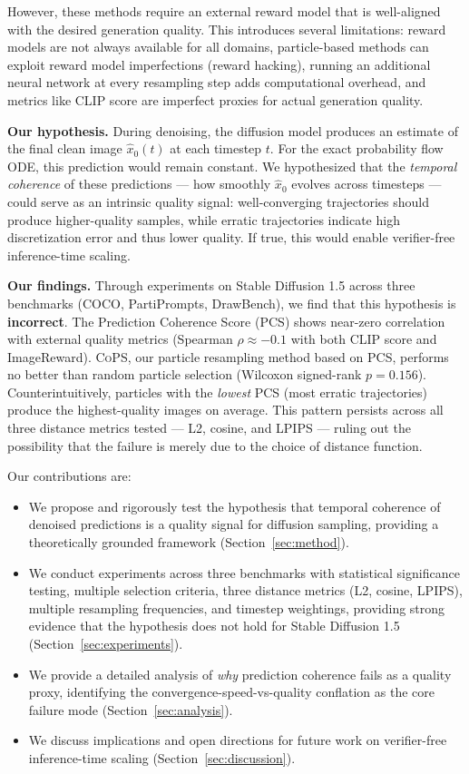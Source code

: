 \documentclass{article}
\newcommand{\cops}{\textsc{CoPS}}
\newcommand{\pcs}{\textsc{PCS}}
\newcommand{\xhat}{\hat{x}_0}
\begin{document}
However, these methods require an external reward model that is well-aligned with the desired generation quality. This introduces several limitations: reward models are not always available for all domains, particle-based methods can exploit reward model imperfections (reward hacking), running an additional neural network at every resampling step adds computational overhead, and metrics like CLIP score are imperfect proxies for actual generation quality.

\textbf{Our hypothesis.} During denoising, the diffusion model produces an estimate of the final clean image $\xhat(t)$ at each timestep $t$. For the exact probability flow ODE, this prediction would remain constant. We hypothesized that the \emph{temporal coherence} of these predictions --- how smoothly $\xhat$ evolves across timesteps --- could serve as an intrinsic quality signal: well-converging trajectories should produce higher-quality samples, while erratic trajectories indicate high discretization error and thus lower quality. If true, this would enable verifier-free inference-time scaling.

\textbf{Our findings.} Through experiments on Stable Diffusion 1.5 across three benchmarks (COCO, PartiPrompts, DrawBench), we find that this hypothesis is \textbf{incorrect}. The Prediction Coherence Score (\pcs{}) shows near-zero correlation with external quality metrics (Spearman $\rho \approx -0.1$ with both CLIP score and ImageReward). \cops{}, our particle resampling method based on \pcs{}, performs no better than random particle selection (Wilcoxon signed-rank $p = 0.156$). Counterintuitively, particles with the \emph{lowest} \pcs{} (most erratic trajectories) produce the highest-quality images on average. This pattern persists across all three distance metrics tested --- L2, cosine, and LPIPS --- ruling out the possibility that the failure is merely due to the choice of distance function.

Our contributions are:
\begin{itemize}
    \item We propose and rigorously test the hypothesis that temporal coherence of denoised predictions is a quality signal for diffusion sampling, providing a theoretically grounded framework (Section~\ref{sec:method}).
    \item We conduct experiments across three benchmarks with statistical significance testing, multiple selection criteria, three distance metrics (L2, cosine, LPIPS), multiple resampling frequencies, and timestep weightings, providing strong evidence that the hypothesis does not hold for Stable Diffusion 1.5 (Section~\ref{sec:experiments}).
    \item We provide a detailed analysis of \emph{why} prediction coherence fails as a quality proxy, identifying the convergence-speed-vs-quality conflation as the core failure mode (Section~\ref{sec:analysis}).
    \item We discuss implications and open directions for future work on verifier-free inference-time scaling (Section~\ref{sec:discussion}).
\end{itemize}
\end{document}
